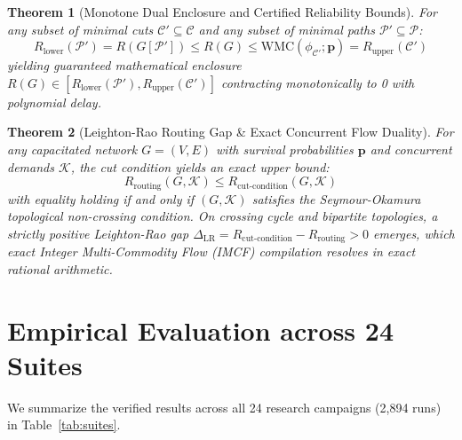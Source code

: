 \documentclass[10pt,journal,compsoc]{IEEEtran}
\newtheorem{theorem}{Theorem}
\begin{document}
\begin{theorem}[Monotone Dual Enclosure and Certified Reliability Bounds]
For any subset of minimal cuts $\mathcal{C}' \subseteq \mathcal{C}$ and any subset of minimal paths $\mathcal{P}' \subseteq \mathcal{P}$:
\begin{equation}
R_{\text{lower}}(\mathcal{P}') = R(G[\mathcal{P}']) \le R(G) \le \text{WMC}(\phi_{\mathcal{C}'}; \mathbf{p}) = R_{\text{upper}}(\mathcal{C}')
\end{equation}
yielding guaranteed mathematical enclosure $R(G) \in [R_{\text{lower}}(\mathcal{P}'), R_{\text{upper}}(\mathcal{C}')]$ contracting monotonically to 0 with polynomial delay.
\end{theorem}

\begin{theorem}[Leighton-Rao Routing Gap \& Exact Concurrent Flow Duality]
For any capacitated network $G = (V, E)$ with survival probabilities $\mathbf{p}$ and concurrent demands $\mathcal{K}$, the cut condition yields an exact upper bound:
\begin{equation}
R_{\text{routing}}(G, \mathcal{K}) \le R_{\text{cut-condition}}(G, \mathcal{K})
\end{equation}
with equality holding if and only if $(G, \mathcal{K})$ satisfies the Seymour-Okamura topological non-crossing condition. On crossing cycle and bipartite topologies, a strictly positive Leighton-Rao gap $\Delta_{\text{LR}} = R_{\text{cut-condition}} - R_{\text{routing}} > 0$ emerges, which exact Integer Multi-Commodity Flow (IMCF) compilation resolves in exact rational arithmetic.
\end{theorem}

\section{Empirical Evaluation across 24 Suites}

We summarize the verified results across all 24 research campaigns (2,894 runs) in Table~\ref{tab:suites}.
\end{document}
